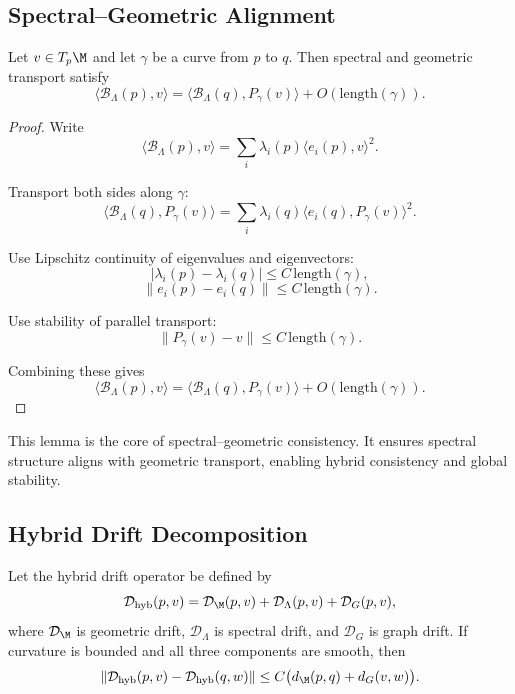 \subsection{Spectral--Geometric Alignment}

\begin{lemma}
Let $v \in T_p\M$ and let $\gamma$ be a curve from $p$ to $q$.  
Then spectral and geometric transport satisfy
\[
\langle \mathcal{B}_\Lambda(p), v \rangle
=
\langle \mathcal{B}_\Lambda(q), P_\gamma(v) \rangle
+ O(\mathrm{length}(\gamma)).
\]
\end{lemma}

\begin{proof}
Write
\[
\langle \mathcal{B}_\Lambda(p), v \rangle
= \sum_i \lambda_i(p) \langle e_i(p), v \rangle^2.
\]

Transport both sides along $\gamma$:
\[
\langle \mathcal{B}_\Lambda(q), P_\gamma(v) \rangle
= \sum_i \lambda_i(q) \langle e_i(q), P_\gamma(v) \rangle^2.
\]

Use Lipschitz continuity of eigenvalues and eigenvectors:
\[
|\lambda_i(p) - \lambda_i(q)| \le C\, \mathrm{length}(\gamma),
\]
\[
\|e_i(p) - e_i(q)\| \le C\, \mathrm{length}(\gamma).
\]

Use stability of parallel transport:
\[
\|P_\gamma(v) - v\| \le C\, \mathrm{length}(\gamma).
\]

Combining these gives
\[
\langle \mathcal{B}_\Lambda(p), v \rangle
=
\langle \mathcal{B}_\Lambda(q), P_\gamma(v) \rangle
+ O(\mathrm{length}(\gamma)).
\]
\end{proof}

\begin{remark}
This lemma is the core of spectral--geometric consistency.  
It ensures spectral structure aligns with geometric transport, enabling
hybrid consistency and global stability.
\end{remark}


\subsection{Hybrid Drift Decomposition}

\begin{lemma}
Let the hybrid drift operator be defined by
\[
\mathcal{D}_{\mathrm{hyb}}(p,v)
=
\mathcal{D}_\M(p,v)
+
\mathcal{D}_\Lambda(p,v)
+
\mathcal{D}_G(p,v),
\]
where $\mathcal{D}_\M$ is geometric drift, $\mathcal{D}_\Lambda$ is spectral
drift, and $\mathcal{D}_G$ is graph drift.  
If curvature is bounded and all three components are smooth, then
\[
\|\mathcal{D}_{\mathrm{hyb}}(p,v)
-
\mathcal{D}_{\mathrm{hyb}}(q,w)\|
\le
C\big(d_\M(p,q) + d_G(v,w)\big).
\]
\end{lemma}

